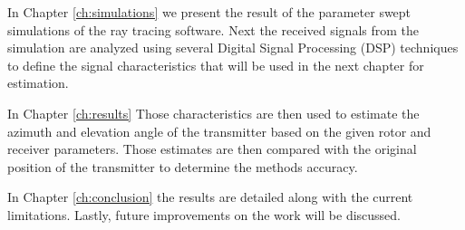 In Chapter \ref{ch:simulations} we present the result of the parameter swept simulations of the ray tracing software. Next the received signals from the simulation are analyzed using several Digital Signal Processing (DSP) techniques to define the signal characteristics that will be used in the next chapter for estimation. 

In Chapter  \ref{ch:results} Those characteristics are then used to estimate the azimuth and elevation angle of the transmitter based on the given rotor and receiver parameters. Those estimates are then compared with the original position of the transmitter to determine the methods accuracy.

In Chapter \ref{ch:conclusion} the results are detailed along with the current limitations. Lastly, future improvements on the work will be discussed.